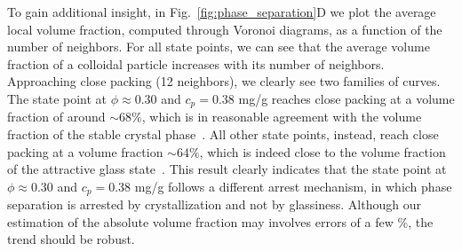 \documentclass[12pt]{article}
\begin{document}
To gain additional insight, in Fig.~\ref{fig:phase_separation}D we plot the average local volume fraction, computed
through Voronoi diagrams, as a function of the number of neighbors. For all state points, we can see that the average volume fraction of a colloidal
particle increases with its number of neighbors. Approaching close packing (12 neighbors), we clearly see two families of curves. The state point
at $\phi\approx 0.30$ and $c_p=0.38$ mg/g reaches close packing at a volume fraction of around $\sim 68\%$, which is in reasonable agreement with the
volume fraction of the stable crystal phase~\cite{ilett1995phase}. All other state points, instead, reach close packing at a volume fraction $\sim 64\%$, which is
indeed close to the volume fraction of the attractive glass state~\cite{pham2002multiple}. 
This result clearly indicates that the state point at $\phi\approx 0.30$ and $c_p=0.38$ mg/g follows a different arrest mechanism, in which phase separation
is arrested by crystallization and not by glassiness. Although our estimation of the absolute volume fraction may involves errors of a few \%, the trend should be robust.


% 

% 
% 
\end{document}

